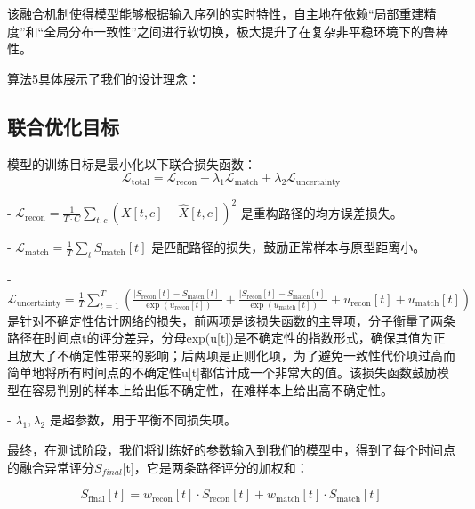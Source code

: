 \documentclass{setp-new}
\begin{document}
该融合机制使得模型能够根据输入序列的实时特性，自主地在依赖“局部重建精度”和“全局分布一致性”之间进行软切换，极大提升了在复杂非平稳环境下的鲁棒性。

算法5具体展示了我们的设计理念：
\begin{algorithm}[H]
\caption{不确定性感知自适应融合模块}
\label{alg:joint_optimization}
\begin{algorithmic}[1]
\Require 

\end{algorithmic}
\end{algorithm}

\subsection{联合优化目标}
模型的训练目标是最小化以下联合损失函数：
\begin{equation}
\mathcal{L}_{\text{total}} = \mathcal{L}_{\text{recon}} + \lambda_1 \mathcal{L}_{\text{match}} + \lambda_2 \mathcal{L}_{\text{uncertainty}}\tag{21}
\end{equation}

- $\mathcal{L}_{\text{recon}} = \frac{1}{T \cdot C} \sum_{t,c} \left( X[t,c] - \hat{X}[t,c] \right)^2$ 是重构路径的均方误差损失。

- $\mathcal{L}_{\text{match}} = \frac{1}{T} \sum_{t} S_{\text{match}}[t]$ 是匹配路径的损失，鼓励正常样本与原型距离小。

- $\mathcal{L}_{\text{uncertainty}}=\frac{1}{T} \sum_{t=1}^{T} \left( \frac{|S_{\text{recon}}[t] - S_{\text{match}}[t]|}{\exp(u_{\text{recon}}[t])} + \frac{|S_{\text{recon}}[t] - S_{\text{match}}[t]|}{\exp(u_{\text{match}}[t])} + u_{\text{recon}}[t] + u_{\text{match}}[t] \right)$ 是针对不确定性估计网络的损失，前两项是该损失函数的主导项，分子衡量了两条路径在时间点t的评分差异，分母exp(u[t])是不确定性的指数形式，确保其值为正且放大了不确定性带来的影响；后两项是正则化项，为了避免一致性代价项过高而简单地将所有时间点的不确定性u[t]都估计成一个非常大的值。该损失函数鼓励模型在容易判别的样本上给出低不确定性，在难样本上给出高不确定性。

- $\lambda_1, \lambda_2$ 是超参数，用于平衡不同损失项。

最终，在测试阶段，我们将训练好的参数输入到我们的模型中，得到了每个时间点的融合异常评分$S_{final}$[t]，它是两条路径评分的加权和：

\begin{equation}
S_{\text{final}}[t] = w_{\text{recon}}[t] \cdot S_{\text{recon}}[t] + w_{\text{match}}[t] \cdot S_{\text{match}}[t]\tag{22}
\end{equation}
\end{document}
